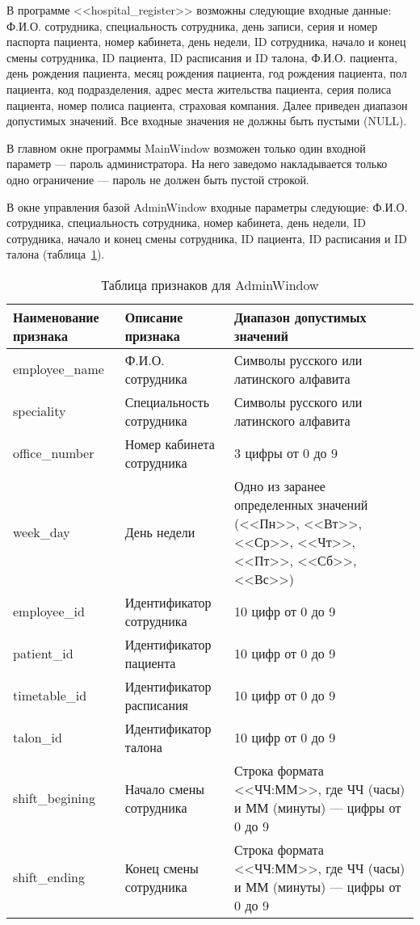 В программе <<hospital\_register>> возможны следующие входные данные:
Ф.И.О. сотрудника, специальность сотрудника, день записи, серия и номер паспорта пациента, номер кабинета, день недели, ID сотрудника, начало и конец смены сотрудника, ID пациента, ID расписания и ID талона, Ф.И.О. пациента, день рождения пациента, месяц рождения пациента, год рождения пациента, пол пациента, код подразделения, адрес места жительства пациента, серия полиса пациента, номер полиса пациента, страховая компания.
Далее приведен диапазон допустимых значений. Все входные значения не должны быть пустыми (NULL).

В главном окне программы MainWindow возможен только один входной параметр --- пароль администратора. На него заведомо накладывается только одно ограничение --- пароль не должен быть пустой строкой.

В окне управления базой AdminWindow входные параметры следующие: Ф.И.О. сотрудника, специальность сотрудника, номер кабинета, день недели, ID сотрудника, начало и конец смены сотрудника, ID пациента, ID расписания и ID талона (таблица~\ref{tab:tab_1}). 

\begin{table}[ht]
\caption{Таблица признаков для AdminWindow}
\label{tab:tab_1}
\begin{center}
\begin{tabularx}{\linewidth}{|X|X|X|}
\hline
 Наименование признака & Описание признака & Диапазон допустимых значений\\
\hline
 employee\_name & Ф.И.О. сотрудника & Символы русского или латинского алфавита\\
\hline
 speciality & Специальность сотрудника & Символы русского или латинского алфавита\\
\hline
 office\_number & Номер кабинета сотрудника & 3 цифры от 0 до 9\\
\hline
 week\_day & День недели & Одно из заранее определенных значений (<<Пн>>, <<Вт>>, <<Ср>>, <<Чт>>, <<Пт>>, <<Сб>>, <<Вс>>)\\
\hline
 employee\_id & Идентификатор сотрудника & 10 цифр от 0 до 9 \\
\hline
 patient\_id & Идентификатор пациента & 10 цифр от 0 до 9 \\
\hline
 timetable\_id & Идентификатор расписания & 10 цифр от 0 до 9 \\
\hline
 talon\_id & Идентификатор талона & 10 цифр от 0 до 9 \\
\hline
 shift\_begining & Начало смены сотрудника & Строка формата <<ЧЧ:ММ>>, где ЧЧ (часы) и ММ (минуты) --- цифры от 0 до 9 \\
\hline
 shift\_ending & Конец смены сотрудника & Строка формата <<ЧЧ:ММ>>, где ЧЧ (часы) и ММ (минуты) --- цифры от 0 до 9\\
\hline
\end{tabularx}
\end{center}
\end{table}

